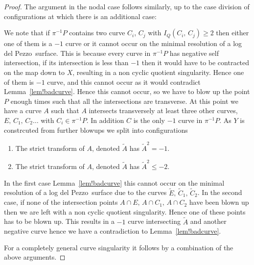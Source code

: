 \documentclass[11pt]{amsbook}
\theoremstyle{definition}
\theoremstyle{definition}
\theoremstyle{definition}
\theoremstyle{definition}
\theoremstyle{definition}
\theoremstyle{definition}
\theoremstyle{definition}
\theoremstyle{definition}
\newcommand{\ldp}{log del Pezzo}
\newcommand{\wt}[1]{\widetilde #1}
\begin{document}
\begin{proof}
The argument in the nodal case follows similarly, up to the case division of configurations
at which there is an additional case:

We note that if $\pi^{-1}{P}$ contains two curve $C_i$, $C_j$ with $I_Q (C_i, \, C_j) \ge 2$ then either one of them is a $-1$ curve or it cannot occur on the minimal resolution of a \ldp\ surface. This is because every curve in $\pi^{-1}{P}$ has negative self intersection, if its intersection is less than $-1$ then it would have to be contracted on the map down to $X$, resulting in a non cyclic quotient singularity. Hence one of them is $-1$ curve, and this cannot occur as it would contradict Lemma~\ref{lem!badcurve}. Hence this cannot occur, so we have to blow up the point $P$ enough times such that all the intersections are transverse. At this point we have a curve $A$ such that $A$ intersects transversely at least three other curves, $E, \, C_1, \, C_2 \dots $ with $C_i \in \pi^{-1} {P}$. In addition $C$ is the only $-1$ curve in $\pi^{-1}{P}$. As $Y$ is constrcuted from further blowups we split into configurations 

\begin{enumerate}
\item
The strict transform of $A$, denoted $\widetilde{A}$ has $\wt{A}^2 = -1$.
\item
The strict transform of $A$, denoted $\widetilde{A}$ has $\wt{A}^2 \leq -2$.
\end{enumerate}

In the first case Lemma~\ref{lem!badcurve} this cannot occur on the minimal resolution of a \ldp\ surface due to the curves $\wt{E}, \, \wt{C_1},\, \wt{C_2}$. In the second case, if none of the intersection points $A\cap E, \, A \cap C_1, \, A \cap C_2$ have been blown up then we are left with a non cyclic quotient singularity. Hence one of these points has to be blown up. This results in a $-1$ curve intersecting $\wt{A}$ and another negative curve hence we have a contradiction to Lemma~\ref{lem!badcurve}.


For a completely general curve singularity it follows by a combination of the above arguments. 
\end{proof}
\end{document}
